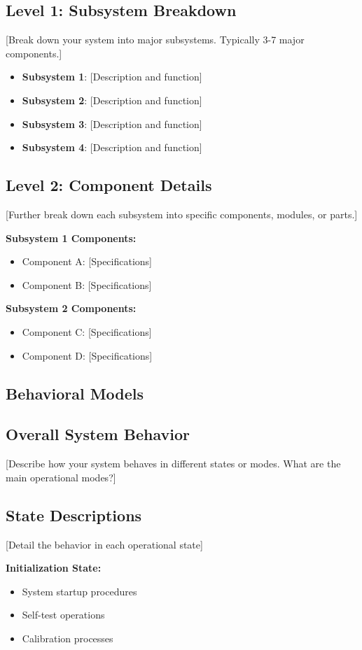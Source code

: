 \documentclass[final]{../designreport}
\newcommand{\behavioralmodels}{\subsection{Behavioral Models}}
\begin{document}
\subsection{Level 1: Subsystem Breakdown}
[Break down your system into major subsystems. Typically 3-7 major components.]

\begin{itemize}
    \item \textbf{Subsystem 1}: [Description and function]
    \item \textbf{Subsystem 2}: [Description and function]  
    \item \textbf{Subsystem 3}: [Description and function]
    \item \textbf{Subsystem 4}: [Description and function]
\end{itemize}

\subsection{Level 2: Component Details}
[Further break down each subsystem into specific components, modules, or parts.]

\textbf{Subsystem 1 Components:}
\begin{itemize}
    \item Component A: [Specifications]
    \item Component B: [Specifications]
\end{itemize}

\textbf{Subsystem 2 Components:}
\begin{itemize}
    \item Component C: [Specifications]
    \item Component D: [Specifications]
\end{itemize}

\behavioralmodels

\subsection{Overall System Behavior}
[Describe how your system behaves in different states or modes. What are the main operational modes?]

\subsection{State Descriptions}
[Detail the behavior in each operational state]

\textbf{Initialization State:}
\begin{itemize}
    \item System startup procedures
    \item Self-test operations
    \item Calibration processes
\end{itemize}
\end{document}
